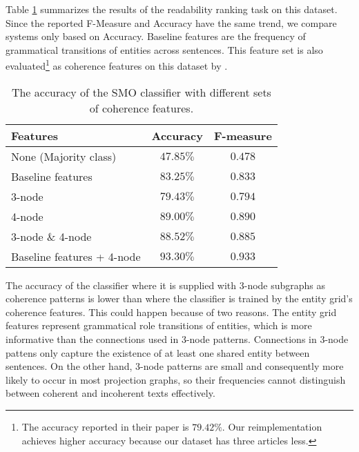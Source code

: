 Table \ref{tab:ranking-pitler} summarizes the results of the readability ranking task on this dataset. 
Since the reported F-Measure and Accuracy have the same trend, we compare systems only based on Accuracy.  
Baseline features are the frequency of grammatical transitions of entities across sentences. 
This feature set is also evaluated\footnote{The accuracy reported in their paper is $79.42\%$. Our reimplementation achieves higher accuracy because our dataset has three articles less.} as coherence features on this dataset by .

\begin{table}[!ht]
	\begin{center}
		\begin{tabular}{lcc}
			\toprule
			\textbf{Features} 						  & \textbf{Accuracy}		& \textbf{F-measure}	\\
			\midrule
			None (Majority class) 			  & $47.85\%$		& $0.478$		\\
			Baseline features 			  	  & $83.25\%$     	& $0.833$		\\
			3-node 							  & $79.43\%$		& $0.794$		\\
			4-node 						      & $89.00\%$		& $0.890$		\\
			3-node \& 4-node 				  & $88.52\%$		& $0.885$		\\
			Baseline features + 4-node 				  & $93.30\%$		& $0.933$		\\
			\bottomrule
		\end{tabular}
	\end{center}
	\caption{The accuracy of the SMO classifier with different sets of coherence features.}
	\label{tab:ranking-pitler}
\end{table}

The accuracy of the classifier where it is supplied with 3-node subgraphs as coherence patterns is lower than where the classifier is trained  by the entity grid's coherence features.   
This could happen because of two reasons. 
The entity grid features represent grammatical role transitions of entities, which is more informative than the connections used in 3-node patterns.
Connections in 3-node pattens only capture the existence of at least one shared entity between sentences. 
On the other hand, 3-node patterns are small and consequently more likely to occur in most projection graphs, so their frequencies cannot distinguish between coherent and incoherent texts effectively. 

